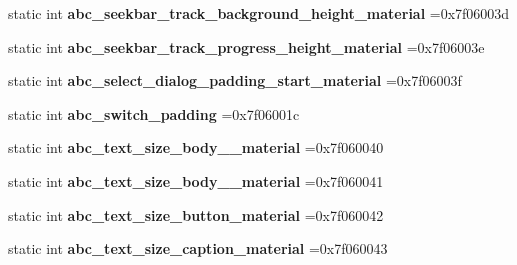 \begin{DoxyCompactItemize}
\item 
\mbox{\label{classandroid_1_1support_1_1design_1_1R_1_1dimen_ae4ff1bb923d41573af244a87ac8f1df7}} 
static int {\bfseries abc\+\_\+seekbar\+\_\+track\+\_\+background\+\_\+height\+\_\+material} =0x7f06003d
\item 
\mbox{\label{classandroid_1_1support_1_1design_1_1R_1_1dimen_a2602eb5beebc3f52b32026cd5a8fb209}} 
static int {\bfseries abc\+\_\+seekbar\+\_\+track\+\_\+progress\+\_\+height\+\_\+material} =0x7f06003e
\item 
\mbox{\label{classandroid_1_1support_1_1design_1_1R_1_1dimen_a3ae91e559ad984a31e359291d3dc04e5}} 
static int {\bfseries abc\+\_\+select\+\_\+dialog\+\_\+padding\+\_\+start\+\_\+material} =0x7f06003f
\item 
\mbox{\label{classandroid_1_1support_1_1design_1_1R_1_1dimen_a430afd1ff3c520bc076c3c01b71b1770}} 
static int {\bfseries abc\+\_\+switch\+\_\+padding} =0x7f06001c
\item 
\mbox{\label{classandroid_1_1support_1_1design_1_1R_1_1dimen_a0783ad700b3d30ef641247bbf95ea040}} 
static int {\bfseries abc\+\_\+text\+\_\+size\+\_\+body\+\_\+\_\+material} =0x7f060040
\item 
\mbox{\label{classandroid_1_1support_1_1design_1_1R_1_1dimen_a224faf3300440a5fd5981a3273ea8a29}} 
static int {\bfseries abc\+\_\+text\+\_\+size\+\_\+body\+\_\+\_\+material} =0x7f060041
\item 
\mbox{\label{classandroid_1_1support_1_1design_1_1R_1_1dimen_ad2f11b8b9bbc51bf4a39a88020daf4eb}} 
static int {\bfseries abc\+\_\+text\+\_\+size\+\_\+button\+\_\+material} =0x7f060042
\item 
\mbox{\label{classandroid_1_1support_1_1design_1_1R_1_1dimen_a50ec65bbfa88ef74ca2f994077e60206}} 
static int {\bfseries abc\+\_\+text\+\_\+size\+\_\+caption\+\_\+material} =0x7f060043

\end{DoxyCompactItemize}

